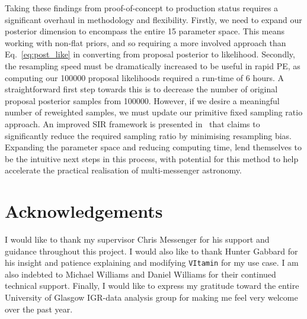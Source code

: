 \documentclass[a4paper]{jpconf}
\begin{document}
Taking these findings from proof-of-concept to production status requires a significant overhaul in methodology and flexibility. Firstly, we need to expand our posterior dimension to encompass the entire 15 parameter space. This means working with non-flat priors, and so requiring a more involved approach than Eq.~\ref{eq:post_like} in converting from proposal posterior to likelihood. Secondly, the resampling speed must be dramatically increased to be useful in rapid PE, as computing our 100000 proposal likelihoods required a run-time of 6 hours. A straightforward first step towards this is to decrease the number of original proposal posterior samples from 100000. However, if we desire a meaningful number of reweighted samples, we must update our primitive fixed sampling ratio approach. An improved SIR framework is presented in~\cite{10.2307/4616798} that claims to significantly reduce the required sampling ratio by minimising resampling bias. Expanding the parameter space and reducing computing time, lend themselves to be the intuitive next steps in this process, with potential for this method to help accelerate the practical realisation of multi-messenger astronomy. 


\section*{Acknowledgements}


I would like to thank my supervisor Chris Messenger for his support and guidance throughout this project. I would also like to thank Hunter Gabbard for his insight and patience explaining and modifying \texttt{VItamin} for my use case. I am also indebted to Michael Williams and Daniel Williams for their continued technical support. Finally, I would like to express my gratitude toward the entire University of Glasgow IGR-data analysis group for making me feel very welcome over the past year.

\printbibliography[
heading=bibintoc,
title={References}
]
\end{document}
